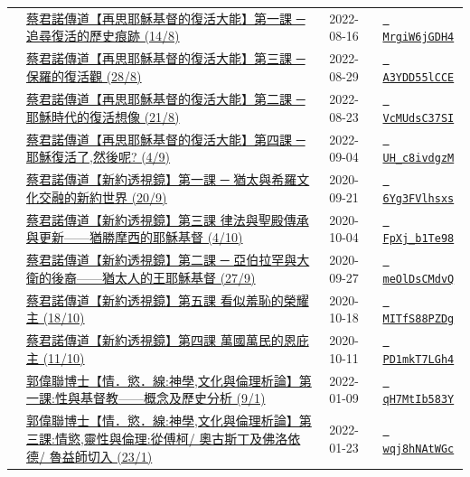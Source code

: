 \documentclass{book}
\begin{document}
{\begin{xltabular}{\textwidth}{|p{0.15\textwidth} p{0.6\textwidth}|p{0.07\textwidth} p{0.1\textwidth}|}
    & \hyperref[sec:MrgiW6jGDH4]{蔡君諾傳道【再思耶穌基督的復活大能】第一課 ─ 追尋復活的歷史痕跡 (14/8)} & 2022-08-16 & \href{https://youtube.com/watch?v=MrgiW6jGDH4}{\texttt{ MrgiW6jGDH4}} \\
    & \hyperref[sec:A3YDD55lCCE]{蔡君諾傳道【再思耶穌基督的復活大能】第三課 ─ 保羅的復活觀 (28/8)} & 2022-08-29 & \href{https://youtube.com/watch?v=A3YDD55lCCE}{\texttt{ A3YDD55lCCE}} \\
    & \hyperref[sec:VcMUdsC37SI]{蔡君諾傳道【再思耶穌基督的復活大能】第二課 ─ 耶穌時代的復活想像 (21/8)} & 2022-08-23 & \href{https://youtube.com/watch?v=VcMUdsC37SI}{\texttt{ VcMUdsC37SI}} \\
    & \hyperref[sec:UH_c8ivdgzM]{蔡君諾傳道【再思耶穌基督的復活大能】第四課 ─ 耶穌復活了,然後呢? (4/9)} & 2022-09-04 & \href{https://youtube.com/watch?v=UH_c8ivdgzM}{\texttt{ UH\_c8ivdgzM}} \\
    & \hyperref[sec:6Yg3FVlhsxs]{蔡君諾傳道【新約透視鏡】第一課 ─ 猶太與希羅文化交融的新約世界 (20/9)} & 2020-09-21 & \href{https://youtube.com/watch?v=6Yg3FVlhsxs}{\texttt{ 6Yg3FVlhsxs}} \\
    & \hyperref[sec:FpXj_b1Te98]{蔡君諾傳道【新約透視鏡】第三課  律法與聖殿傳承與更新——猶勝摩西的耶穌基督 (4/10)} & 2020-10-04 & \href{https://youtube.com/watch?v=FpXj_b1Te98}{\texttt{ FpXj\_b1Te98}} \\
    & \hyperref[sec:meOlDsCMdvQ]{蔡君諾傳道【新約透視鏡】第二課 ─ 亞伯拉罕與大衛的後裔——猶太人的王耶穌基督 (27/9)} & 2020-09-27 & \href{https://youtube.com/watch?v=meOlDsCMdvQ}{\texttt{ meOlDsCMdvQ}} \\
    & \hyperref[sec:MITfS88PZDg]{蔡君諾傳道【新約透視鏡】第五課  看似羞恥的榮耀主 (18/10)} & 2020-10-18 & \href{https://youtube.com/watch?v=MITfS88PZDg}{\texttt{ MITfS88PZDg}} \\
    & \hyperref[sec:PD1mkT7LGh4]{蔡君諾傳道【新約透視鏡】第四課  萬國萬民的恩庇主 (11/10)} & 2020-10-11 & \href{https://youtube.com/watch?v=PD1mkT7LGh4}{\texttt{ PD1mkT7LGh4}} \\
    & \hyperref[sec:qH7MtIb583Y]{郭偉聯博士【情．慾．線:神學,文化與倫理析論】第一課:性與基督教——概念及歷史分析 (9/1)} & 2022-01-09 & \href{https://youtube.com/watch?v=qH7MtIb583Y}{\texttt{ qH7MtIb583Y}} \\
    & \hyperref[sec:wqj8hNAtWGc]{郭偉聯博士【情．慾．線:神學,文化與倫理析論】第三課:情慾,靈性與倫理:從傅柯/ 奧古斯丁及佛洛依德/ 魯益師切入 (23/1)} & 2022-01-23 & \href{https://youtube.com/watch?v=wqj8hNAtWGc}{\texttt{ wqj8hNAtWGc}} \\

\end{xltabular}}
\end{document}
